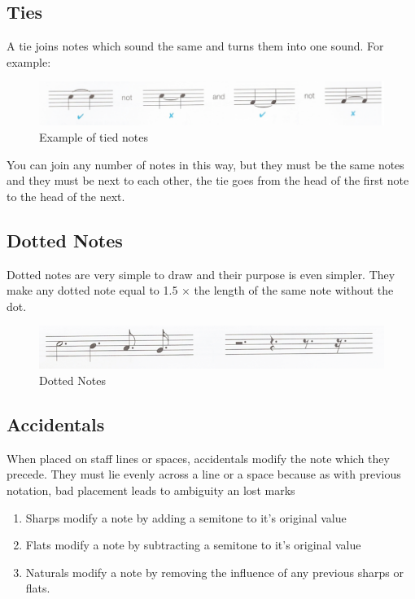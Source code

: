 \subsection {Ties}

A tie joins notes which sound the same and turns them into one sound. For example:

\begin{figure}[h!]
  \includegraphics[width=\linewidth]{gfx/basic/ties.png}
  \centering
  \caption{Example of tied notes}
  \label{fig:TiedNotes}
\end{figure}

You can join any number of notes in this way, but they must be the same notes and they must be next to each other, the tie goes from the head of the first note to the head of the next.

\subsection{Dotted Notes}

Dotted notes are very simple to draw and their purpose is even simpler. They make any dotted note equal to 1.5 $\times$ the length of the same note without the dot.

\begin{figure}[h!]
  \includegraphics[width=\linewidth]{gfx/basic/dotted-notes.png}
  \centering
  \caption{Dotted Notes}
  \label{fig:DottedNotes}
\end{figure}

\subsection{Accidentals}

When placed on staff lines or spaces, accidentals modify the note which they precede. They must lie evenly across a line or a space because as with previous notation, bad placement leads to ambiguity an lost marks

\begin{enumerate}
\item Sharps modify a note by adding a semitone to it's original value
\item Flats modify a note by subtracting a semitone to it's original value
\item Naturals modify a note by removing the influence of any previous sharps or flats.
\end{enumerate}


